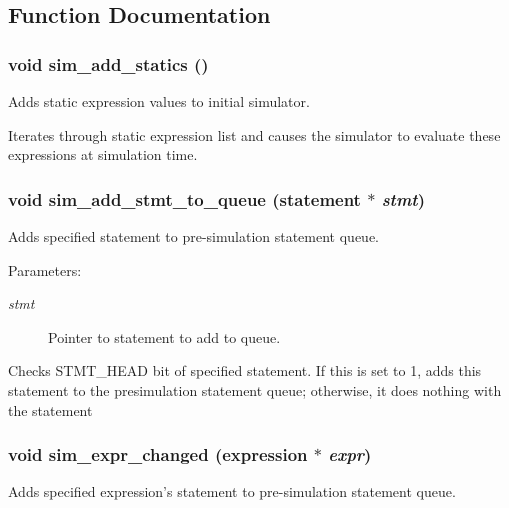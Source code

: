 \subsection{Function Documentation}
\subsubsection{\setlength{\rightskip}{0pt plus 5cm}void sim\_\-add\_\-statics ()}\label{sim_8h_a2}


Adds static expression values to initial simulator.

Iterates through static expression list and causes the simulator to evaluate these expressions at simulation time. 
\subsubsection{\setlength{\rightskip}{0pt plus 5cm}void sim\_\-add\_\-stmt\_\-to\_\-queue ({\bf statement} $\ast$ {\em stmt})}\label{sim_8h_a1}


Adds specified statement to pre-simulation statement queue.

\begin{Desc}
\item[Parameters:]
\begin{description}
\item[{\em stmt}]Pointer to statement to add to queue.\end{description}
\end{Desc}
Checks STMT\_\-HEAD bit of specified statement. If this is set to 1, adds this statement to the presimulation statement queue; otherwise, it does nothing with the statement 
\subsubsection{\setlength{\rightskip}{0pt plus 5cm}void sim\_\-expr\_\-changed ({\bf expression} $\ast$ {\em expr})}\label{sim_8h_a0}


Adds specified expression's statement to pre-simulation statement queue.

